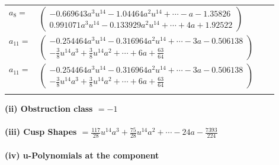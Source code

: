 \documentclass[1p]{elsarticle_modified}
\theoremstyle{definition}
\begin{document}
\begin{tabular}{m{7pt} m{180pt} m{7pt} m{180pt} }
\flushright $a_{8}=$&$\begin{pmatrix}-0.669643 a^{3} u^{14}-1.04464 a^{2} u^{14}+\cdots-a-1.35826\\0.991071 a^{3} u^{14}-0.133929 a^{2} u^{14}+\cdots+4 a+1.92522\end{pmatrix}$ \\
\flushright $a_{11}=$&$\begin{pmatrix}-0.254464 a^{3} u^{14}-0.316964 a^{2} u^{14}+\cdots-3 a-0.506138\\-\frac{3}{8} u^{14} a^3+\frac{3}{8} u^{14} a^2+\cdots+6 a+\frac{63}{64}\end{pmatrix}$\\ \flushright $a_{11}=$&$\begin{pmatrix}-0.254464 a^{3} u^{14}-0.316964 a^{2} u^{14}+\cdots-3 a-0.506138\\-\frac{3}{8} u^{14} a^3+\frac{3}{8} u^{14} a^2+\cdots+6 a+\frac{63}{64}\end{pmatrix}$\\&\end{tabular}
\flushleft \textbf{(ii) Obstruction class $= -1$}\\~\\
\flushleft \textbf{(iii) Cusp Shapes $= \frac{117}{28} u^{14} a^3+\frac{75}{28} u^{14} a^2+\cdots-24 a-\frac{7393}{224}$}\\~\\
\newpage\renewcommand{\arraystretch}{1}
\flushleft \textbf{(iv) u-Polynomials at the component}\newline \\
\end{document}
